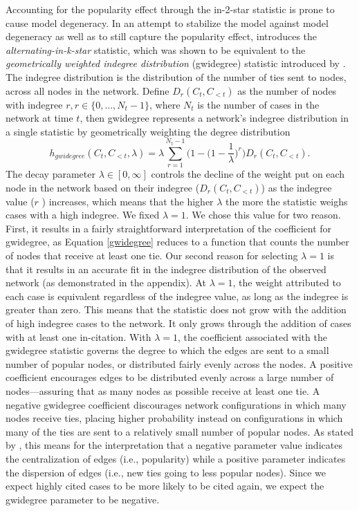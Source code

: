 \documentclass{cup-pan}
\begin{document}
Accounting for the popularity effect through the in-2-star statistic is prone to cause model degeneracy. In an attempt to stabilize the model against model degeneracy as well as to still capture the popularity effect, \citet{SnijdersTomA.B..2006} introduces the \textit{alternating-in-k-star} statistic, which was shown to be equivalent to the \textit{geometrically weighted indegree distribution} (gwidegree) statistic introduced by \citet{hunter2006inference}. The indegree distribution is the distribution of the number of ties sent to nodes, across all nodes in the network. Define $D_r(C_t, C_{<t})$ as the number of nodes with indegree $r, r \in \{0, \dots , N_t -1 \}$, where $N_t$ is the number of cases in the network at time $t$, then gwidegree represents a network's indegree distribution in a single statistic by geometrically weighting the degree distribution
\begin{equation}
h_{gwidegree}(C_{t}, C_{<t}, \lambda)= \lambda \sum_{r=1}^{N_t-1}\biggl(1-\bigl(1-\frac{1}{\lambda}\bigr)^r\biggr)D_r(C_t, C_{<t}). 
\label{gwidegree}
\end{equation}
The decay parameter $\lambda \in [0, \infty ]$ controls the decline of the weight put on each node in the network based on their indegree ($D_r(C_t, C_{<t})$) as the indegree value ($r$ ) increases, which means that the higher $\lambda$ the more the statistic weighs cases with a high indegree. We fixed $\lambda=1$. We chose this value for two reason. First, it results in a fairly straightforward interpretation of the coefficient for gwidegree, as Equation \ref{gwidegree} reduces to a function that counts the number of nodes that receive at least one tie. Our second reason for selecting $\lambda=1$ is that it results in an accurate fit in the indegree distribution of the observed network (as demonstrated in the appendix). At $\lambda=1$, the weight attributed to each case is equivalent regardless of the indegree value, as long as the indegree is greater than zero. This means that the statistic does not grow with the addition of high indegree cases to the network. It only grows through the addition of cases with at least one in-citation. With  $\lambda=1$, the coefficient associated with the gwidegree statistic governs the degree to which the edges are sent to a small number of popular nodes, or distributed fairly evenly across the nodes. A positive coefficient encourages edges to be distributed evenly across a large number of nodes---assuring that as many nodes as possible receive at least one tie. A negative gwidegree coefficient discourages network configurations in which many nodes receive ties, placing higher probability instead on configurations in which many of the ties are sent to a relatively small number of popular nodes. As stated by \citet{Levy2016}, this means for the interpretation that a negative parameter value indicates the centralization of edges (i.e., popularity) while a positive parameter indicates the dispersion of edges (i.e., new ties going to less popular nodes).  Since we expect highly cited cases to be more likely to be cited again, we expect the gwidegree parameter to be negative.
\end{document}
